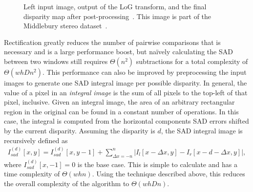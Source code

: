 \documentclass{article}
\newcommand{\abs}[1]{\left|#1\right|}
\begin{document}
\begin{figure}
    \centering
    \caption{
        Left input image, output of the LoG transform, and the final disparity
        map after post-processing~\cite{konolige97}. This image is part of the
        Middlebury stereo dataset~\cite{scharstein2003}.
    }
    \label{fig:images}
\end{figure}

Rectification greatly reduces the number of pairwise comparisons that is
necessary and is a large performance boost, but na\"{i}vely calculating the SAD
between two windows still requires $\Theta(n^2)$ subtractions for a total
complexity of $\Theta(whDn^2)$. This performance can also be improved by
preprocessing the input images to generate one SAD integral image per possible
disparity. In general, the value of a pixel in an \textit{integral image} is
the sum of all pixels to the top-left of that pixel, inclusive. Given an
integral image, the area of an arbitrary rectangular region in the original can
be found in a constant number of operations. In this case, the integral is
computed from the horizontal components SAD errors shifted by the current
disparity. Assuming the disparity is $d$, the SAD integral image is recursively
defined as
\begin{align*}
    I_{sad}^{(d)}[x, y] =
        I_{sad}^{(d)}[x, y - 1]
        + \sum_{\Delta x = -n}^n
          \abs{I_l[x - \Delta x, y] - I_r[x - d - \Delta x, y]},
\end{align*}
where $I_{sad}^{(d)}[x, -1] = 0$ is the base case. This is simple to calculate
and has a time complexity of $\Theta(w h n)$. Using the technique described
above, this reduces the overall complexity of the algorithm to $\Theta(whDn)$.
\end{document}
